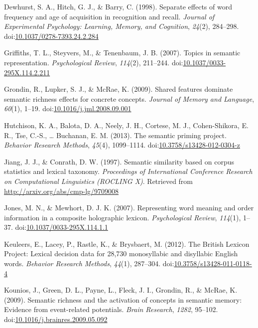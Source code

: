 \documentclass[english,man]{apa6}
\theoremstyle{definition}
\theoremstyle{definition}
\theoremstyle{definition}
\theoremstyle{remark}
\begin{document}
\hypertarget{ref-Dewhurst1998}{}
Dewhurst, S. A., Hitch, G. J., \& Barry, C. (1998). Separate effects of
word frequency and age of acquisition in recognition and recall.
\emph{Journal of Experimental Psychology: Learning, Memory, and
Cognition}, \emph{24}(2), 284--298.
doi:\href{https://doi.org/10.1037/0278-7393.24.2.284}{10.1037/0278-7393.24.2.284}

\hypertarget{ref-Griffiths2007}{}
Griffiths, T. L., Steyvers, M., \& Tenenbaum, J. B. (2007). Topics in
semantic representation. \emph{Psychological Review}, \emph{114}(2),
211--244.
doi:\href{https://doi.org/10.1037/0033-295X.114.2.211}{10.1037/0033-295X.114.2.211}

\hypertarget{ref-Grondin2009}{}
Grondin, R., Lupker, S. J., \& McRae, K. (2009). Shared features
dominate semantic richness effects for concrete concepts. \emph{Journal
of Memory and Language}, \emph{60}(1), 1--19.
doi:\href{https://doi.org/10.1016/j.jml.2008.09.001}{10.1016/j.jml.2008.09.001}

\hypertarget{ref-Hutchison2013}{}
Hutchison, K. A., Balota, D. A., Neely, J. H., Cortese, M. J.,
Cohen-Shikora, E. R., Tse, C.-S., \ldots{} Buchanan, E. M. (2013). The
semantic priming project. \emph{Behavior Research Methods},
\emph{45}(4), 1099--1114.
doi:\href{https://doi.org/10.3758/s13428-012-0304-z}{10.3758/s13428-012-0304-z}

\hypertarget{ref-Jiang1997}{}
Jiang, J. J., \& Conrath, D. W. (1997). Semantic similarity based on
corpus statistics and lexical taxonomy. \emph{Proceedings of
International Conference Research on Computational Linguistics (ROCLING
X)}. Retrieved from \url{http://arxiv.org/abs/cmp-lg/9709008}

\hypertarget{ref-Jones2007}{}
Jones, M. N., \& Mewhort, D. J. K. (2007). Representing word meaning and
order information in a composite holographic lexicon.
\emph{Psychological Review}, \emph{114}(1), 1--37.
doi:\href{https://doi.org/10.1037/0033-295X.114.1.1}{10.1037/0033-295X.114.1.1}

\hypertarget{ref-Keuleers2012}{}
Keuleers, E., Lacey, P., Rastle, K., \& Brysbaert, M. (2012). The
British Lexicon Project: Lexical decision data for 28,730 monosyllabic
and disyllabic English words. \emph{Behavior Research Methods},
\emph{44}(1), 287--304.
doi:\href{https://doi.org/10.3758/s13428-011-0118-4}{10.3758/s13428-011-0118-4}

\hypertarget{ref-Kounios2009}{}
Kounios, J., Green, D. L., Payne, L., Fleck, J. I., Grondin, R., \&
McRae, K. (2009). Semantic richness and the activation of concepts in
semantic memory: Evidence from event-related potentials. \emph{Brain
Research}, \emph{1282}, 95--102.
doi:\href{https://doi.org/10.1016/j.brainres.2009.05.092}{10.1016/j.brainres.2009.05.092}
\end{document}
